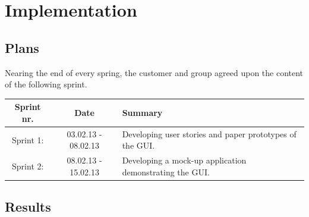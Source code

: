 \chapter{Implementation}
\section{Plans}


Nearing the end of every spring, the customer and group agreed upon the content of the following sprint. 


\begin{tabular}{|c|c|p{6cm}|}
\hline
Sprint nr. & Date & Summary\\
\hline
Sprint 1: & 03.02.13 - 08.02.13 & Developing user stories and paper prototypes of the GUI.\\ 
\hline
Sprint 2: & 08.02.13 - 15.02.13 & Developing a mock-up application demonstrating the GUI.\\
\hline

\end{tabular} 

 

\section{Results}
